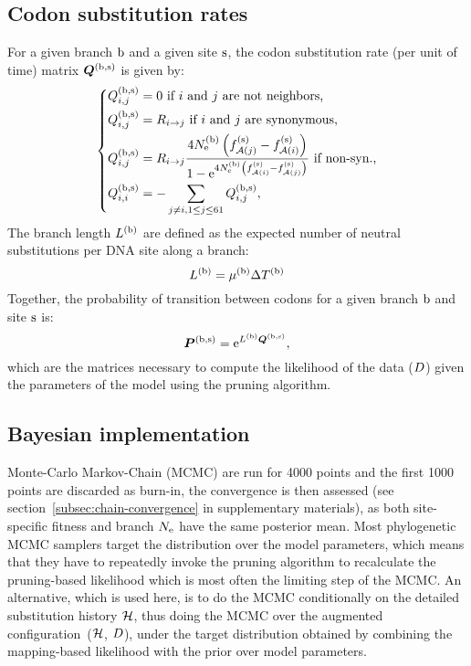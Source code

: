 \subsection{Codon {substitution} rates}
For a given branch $\text{b}$ and a given site $\text{s}$, the \gls{codon} \gls{substitution} rate (per unit of time) matrix $\bm{Q}^{(\text{b}, \text{s})}$ is given by:
\begin{equation}
    \label{eq:subrates}
    \begin{dcases}
        \submatrix\branchsiteexp_{\itoj} = 0\text{ if $\ci$ and $\cj$ are not neighbors,} \\
        \submatrix\branchsiteexp_{\itoj} = \mutmatrix_{\nucitoj}\text{ if $\ci$ and $\cj$ are synonymous,} \\
        \submatrix\branchsiteexp_{\itoj} = \mutmatrix_{\nucitoj} \dfrac{4\Ne\branchexp \left({\fitj\siteexp - \fiti\siteexp}\right)}{{1 - \e^{4\Ne\branchexp\left({\fiti\siteexp - \fitj\siteexp}\right)} }} \text{ if non-syn.,}\\
        \submatrix\branchsiteexp_{\ci, \ci} = - \sum\limits_{ \cj \neq \ci, \jSetCodon} \submatrix\branchsiteexp_{\itoj},
    \end{dcases}
\end{equation}
The branch length $L^{(\text{b})}$ are defined as the expected number of \gls{neutral} \glspl{substitution} per \acrshort{DNA} site along a branch:
\begin{equation}
    \label{eq:branchlength}
    \branchlength\branchexp = \mu\branchexp \branchtime\branchexp
\end{equation}
Together, the probability of {transition} between \glspl{codon} for a given branch $\text{b}$ and site $\text{s}$ is:
\begin{equation}
    \label{eq:Probmatrix}
    \Probmatrix\branchsiteexp = \e^{\branchlength\branchexp \Submatrix\branchsiteexp},
\end{equation}
which are the matrices necessary to compute the \gls{likelihood} of the data ($D$) given the parameters of the model using the pruning algorithm.

\subsection{Bayesian implementation}
\label{sec:Bayesian}
Monte-Carlo Markov-Chain (\acrshort{MCMC}) are run for 4000 points and the first 1000 points are discarded as burn-in, the convergence is then assessed (see section~\ref{subsec:chain-convergence} in supplementary materials), as both site-specific fitness and branch $N_{\mathrm{e}}$ have the same posterior mean.
Most phylogenetic MCMC samplers target the distribution over the model parameters, which means that they have to repeatedly invoke the pruning algorithm to recalculate the pruning-based \gls{likelihood} which is most often the limiting step of the \acrshort{MCMC}.
An alternative, which is used here, is to do the \acrshort{MCMC} conditionally on the detailed \gls{substitution} history $\mathcal{H}$, thus doing the \acrshort{MCMC} over the augmented configuration~($\mathcal{H}$, $D$), under the target distribution obtained by combining the mapping-based \gls{likelihood} with the \gls{prior} over model parameters.

